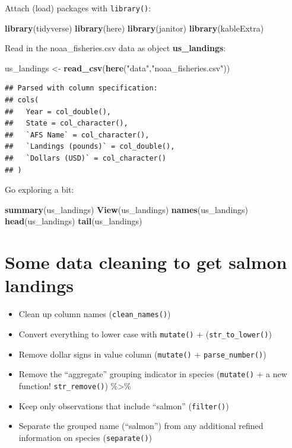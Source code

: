 \documentclass[]{book}
\newenvironment{Shaded}{\begin{snugshade}}{\end{snugshade}}
\newcommand{\KeywordTok}[1]{\textcolor[rgb]{0.13,0.29,0.53}{\textbf{#1}}}
\newcommand{\NormalTok}[1]{#1}
\newcommand{\StringTok}[1]{\textcolor[rgb]{0.31,0.60,0.02}{#1}}
\providecommand{\tightlist}{%
  \setlength{\itemsep}{0pt}\setlength{\parskip}{0pt}}
\begin{document}
Attach (load) packages with \texttt{library()}:

\begin{Shaded}
\begin{Highlighting}[]
\KeywordTok{library}\NormalTok{(tidyverse)}
\KeywordTok{library}\NormalTok{(here)  }
\KeywordTok{library}\NormalTok{(janitor) }
\KeywordTok{library}\NormalTok{(kableExtra)}
\end{Highlighting}
\end{Shaded}

Read in the noaa\_fisheries.csv data as object \textbf{us\_landings}:

\begin{Shaded}
\begin{Highlighting}[]
\NormalTok{us_landings <-}\StringTok{ }\KeywordTok{read_csv}\NormalTok{(}\KeywordTok{here}\NormalTok{(}\StringTok{"data"}\NormalTok{,}\StringTok{"noaa_fisheries.csv"}\NormalTok{))}
\end{Highlighting}
\end{Shaded}

\begin{verbatim}
## Parsed with column specification:
## cols(
##   Year = col_double(),
##   State = col_character(),
##   `AFS Name` = col_character(),
##   `Landings (pounds)` = col_double(),
##   `Dollars (USD)` = col_character()
## )
\end{verbatim}

Go exploring a bit:

\begin{Shaded}
\begin{Highlighting}[]
\KeywordTok{summary}\NormalTok{(us_landings)}
\KeywordTok{View}\NormalTok{(us_landings)}
\KeywordTok{names}\NormalTok{(us_landings)}
\KeywordTok{head}\NormalTok{(us_landings)}
\KeywordTok{tail}\NormalTok{(us_landings)}
\end{Highlighting}
\end{Shaded}

\hypertarget{some-data-cleaning-to-get-salmon-landings}{%
\section{Some data cleaning to get salmon landings}\label{some-data-cleaning-to-get-salmon-landings}}

\begin{itemize}
\tightlist
\item
  Clean up column names (\texttt{clean\_names()})
\item
  Convert everything to lower case with \texttt{mutate()} + (\texttt{str\_to\_lower()})
\item
  Remove dollar signs in value column (\texttt{mutate()} + \texttt{parse\_number()})
\item
  Remove the ``aggregate'' grouping indicator in species (\texttt{mutate()} + a new function! \texttt{str\_remove()}) \%\textgreater{}\%
\item
  Keep only observations that include ``salmon'' (\texttt{filter()})
\item
  Separate the grouped name (``salmon'') from any additional refined information on species (\texttt{separate()})
\end{itemize}
\end{document}
